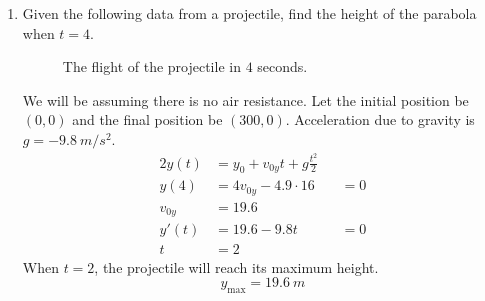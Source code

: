 \begin{enumerate}
  What two variables can you change to determine where the electron will hit?
  (Assume that \(d\) and \(L\) are fixed)
  \begin{figure}[H]
    \centering
    
    \caption{An electron from a cathode ray tube TV moving towards the screen.}
    \label{NUPOCphysics11}
  \end{figure}
  Let's assume the electron has mass \(m\).
  Since the field \(E\) is downward and the electron is negative, there will be
  an upwards force on the electron.
  Since \(d = v_{0x}t\), we have that \(t = \frac{d}{v_{0x}}\) but
  \(t = \frac{L}{v_{0x}}\).
  The upward force on the electron is \(F_e = eE\).
  By Newton's second law,
  \[
  F_e = ma\Rightarrow a = \frac{eE}{m}.
  \]
  When the electron enters the field, \(v_{0y} = 0\) and \(y_0 = 0\).
  Then \(y(t) = a\frac{t^2}{2} = \frac{eEl^2}{2mv_{0x}^2}\).
  This is the distance above \(\frac{d}{2}\) where the electron strikes.
  If \(\frac{eEl^2}{2mv_{0x}^2} > \frac{d}{2}\), then
  \(\frac{eEl^2}{mv_{0x}^2} > d\) which is above the screen so the electron
  misses.
  Suppose \(E\) is uniform.
  Then \(E = \frac{+V}{d}\) and
  \[
  y(t) = \frac{e(+V)L^2}{2mdv_{0x}^2}.\eqnumtag\label{crt}
  \]
  In \cref{crt}, \(L\), \(m\), and \(d\) are fixed.
  By changing the top plate potential, \(+V\), and the velocity of the
  electron, we can alter the the location of the electron striking the screen.
\item
  Given the following data from a projectile, find the height of the parabola
  when \(t = 4\).
  \begin{figure}[H]
    \centering
    
    \caption{The flight of the projectile in \(4\) seconds.}
  \end{figure}
  We will be assuming there is no air resistance.
  Let the initial position be \((0, 0)\) and the final position be
  \((300, 0)\).
  Acceleration due to gravity is \(g = -9.8 \ m/s^2\).
  \begin{alignat*}{2}
    y(t) &= y_0 + v_{0y}t + g\frac{t^2}{2}\\
    y(4) &= 4v_{0y} - 4.9\cdot 16 && = {} 0\\
    v_{0y} &= 19.6\\
    y'(t) &= 19.6 - 9.8t && = {} 0\\
    t &= 2
  \end{alignat*}
  When \(t = 2\), the projectile will reach its maximum height.
  \[
  y_{\max} = 19.6 \ m
\]
\end{enumerate}
